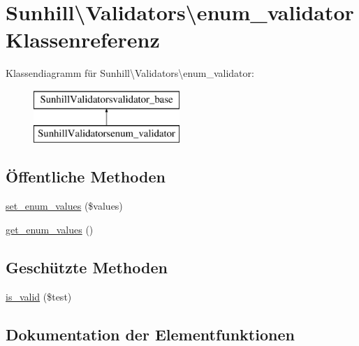 \hypertarget{classSunhill_1_1Validators_1_1enum__validator}{}\section{Sunhill\textbackslash{}Validators\textbackslash{}enum\+\_\+validator Klassenreferenz}
\label{classSunhill_1_1Validators_1_1enum__validator}
Klassendiagramm für Sunhill\textbackslash{}Validators\textbackslash{}enum\+\_\+validator\+:\begin{figure}[H]
\begin{center}
\leavevmode
\includegraphics[height=2.000000cm]{d3/d0b/classSunhill_1_1Validators_1_1enum__validator}
\end{center}
\end{figure}
\subsection*{Öffentliche Methoden}
\begin{DoxyCompactItemize}
\item 
\hyperlink{classSunhill_1_1Validators_1_1enum__validator_af3a3be22740fa74c2fe063cf1fafe467}{set\+\_\+enum\+\_\+values} (\$values)
\item 
\hyperlink{classSunhill_1_1Validators_1_1enum__validator_a817ba72050a361b418fe8affac8f0eef}{get\+\_\+enum\+\_\+values} ()
\end{DoxyCompactItemize}
\subsection*{Geschützte Methoden}
\begin{DoxyCompactItemize}
\item 
\hyperlink{classSunhill_1_1Validators_1_1enum__validator_ac00328723663a42eea318e463e986aa0}{is\+\_\+valid} (\$test)
\end{DoxyCompactItemize}


\subsection{Dokumentation der Elementfunktionen}
\mbox{\label{classSunhill_1_1Validators_1_1enum__validator_a817ba72050a361b418fe8affac8f0eef}} 
